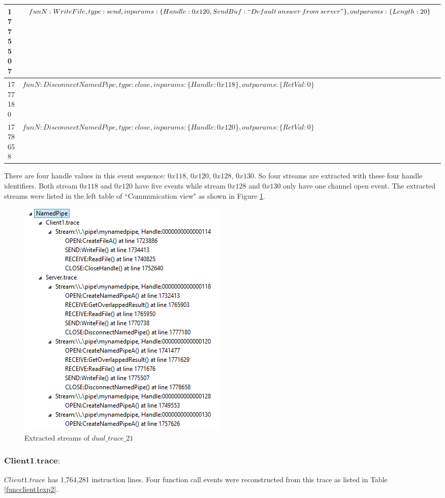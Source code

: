 \documentclass[12pt,oneside]{book}
\begin{document}
\begin{table}[H]
\begin{tabular}{|l|p{16cm}|}
\hline
  1775507 & $funN:WriteFile, type:send, inparams:\lbrace Handle:0x120, SendBuf:``Default\: answer\: from\: server"\rbrace, outparams: \lbrace Length:20 \rbrace$\\
\hline
 1777180&$funN:DisconnectNamedPipe, type:close, inparams: \lbrace Handle:0x118 \rbrace, outparams: \lbrace RetVal:0 \rbrace$\\
\hline   
 1778658&$funN:DisconnectNamedPipe, type:close, inparams: \lbrace Handle:0x120 \rbrace, outparams: \lbrace RetVal:0 \rbrace$\\
\hline               
  \end{tabular}
\end{table}

There are four handle values in this event sequence: $0x118$, $0x120$, $0x128$, $0x130$. So four streams are extracted with these four handle identifiers. Both stream $0x118$ and $0x120$ have five events while stream $0x128$ and $0x130$ only have one channel open event. The extracted streams were listed in the left table  of ``Communication view"  as shown in Figure \ref{result21_streams}.

\begin{figure}[H]
\centerline{\includegraphics{Figures/result21_streams}}
 \caption{Extracted streams of $dual\_trace\_21$}
\label{result21_streams}
\end{figure}

\subsubsection{$\boldsymbol{Client1.trace:}$}
$Client1.trace$ has 1,764,281 instruction lines. Four function call events were reconstructed from this trace as listed in Table \ref{funcclient1exp2}.
\end{document}
